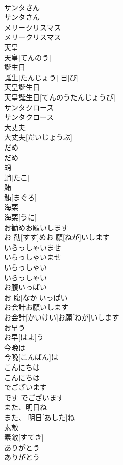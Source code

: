 \documentclass[8pt]{extreport}
\begin{document}
\begin{CJK}{UTF8}{min}
\\	サンタさん	
\\	サンタさん
\\	メリークリスマス	
\\	メリークリスマス
\\	天皇	
\\	天皇[てんのう]
\\	誕生日	
\\	誕生[たんじょう] 日[び]
\\	天皇誕生日	
\\	天皇誕生日[てんのうたんじょうび]
\\	サンタクロース	
\\	サンタクロース
\\	大丈夫	
\\	大丈夫[だいじょうぶ]
\\	だめ	
\\	だめ
\\	蛸	
\\	蛸[たこ]
\\	鮪	
\\	鮪[まぐろ]
\\	海栗	
\\	海栗[うに]
\\	お勧めお願いします	
\\	お 勧[すす]めお 願[ねが]いします
\\	いらっしゃいませ	
\\	いらっしゃいませ
\\	いらっしゃい	
\\	いらっしゃい
\\	お腹いっぱい	
\\	お 腹[なか]いっぱい
\\	お会計お願いします	
\\	お会計[かいけい]お願[ねが]いします
\\	お早う	
\\	お早[はよ]う
\\	今晩は	
\\	今晩[こんばん]は
\\	こんにちは	
\\	こんにちは
\\	でございます	
\\	です	でございます
\\	また、明日ね	
\\	また、 明日[あした]ね
\\	素敵	
\\	素敵[すてき]
\\	ありがとう	
\\	ありがとう

\end{CJK}
\end{document}
